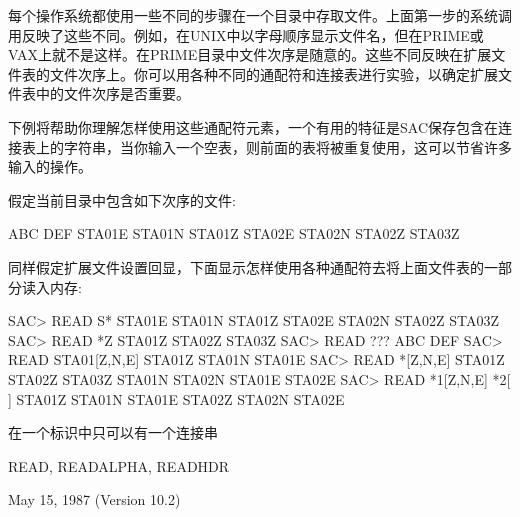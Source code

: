 每个操作系统都使用一些不同的步骤在一个目录中存取文件。上面第一步的系统调用反映了这些不同。例如，在UNIX中以字母顺序显示文件名，但在PRIME或VAX上就不是这样。在PRIME目录中文件次序是随意的。这些不同反映在扩展文件表的文件次序上。你可以用各种不同的通配符和连接表进行实验，以确定扩展文件表中的文件次序是否重要。

下例将帮助你理解怎样使用这些通配符元素，一个有用的特征是SAC保存包含在连接表上的字符串，当你输入一个空表，则前面的表将被重复使用，这可以节省许多输入的操作。

假定当前目录中包含如下次序的文件:

ABC DEF STA01E STA01N STA01Z STA02E STA02N STA02Z STA03Z

同样假定扩展文件设置回显，下面显示怎样使用各种通配符去将上面文件表的一部分读入内存:
\begin{SACCode}
SAC> READ S*
 STA01E STA01N STA01Z STA02E STA02N STA02Z STA03Z
SAC> READ *Z
 STA01Z STA02Z STA03Z
SAC> READ ???
 ABC DEF
SAC> READ STA01[Z,N,E]
 STA01Z STA01N STA01E
SAC> READ *[Z,N,E]
 STA01Z STA02Z STA03Z STA01N STA02N STA01E STA02E
SAC> READ *1[Z,N,E] *2[ ]
 STA01Z STA01N STA01E STA02Z STA02N STA02E
\end{SACCode}

在一个标识中只可以有一个连接串

READ, READALPHA, READHDR

May 15, 1987 (Version 10.2)
